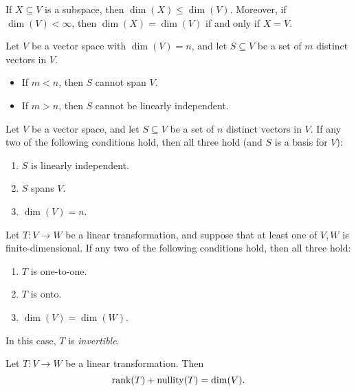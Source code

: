 \begin{fact}
	If $X \subseteq V$ is a subspace, then $\dim(X) \leq \dim(V)$.  Moreover, if
	$\dim(V) < \infty$, then $\dim(X) = \dim(V)$ if and only if $X = V$.
\end{fact}

\begin{fact}
	Let $V$ be a vector space with $\dim(V) = n$, and let $S \subseteq V$ be a set
	of $m$ distinct vectors in $V$.
	\begin{itemize}
		\item If $m < n$, then $S$ cannot span $V$.
		\item If $m > n$, then $S$ cannot be linearly independent.
	\end{itemize}
\end{fact}

\begin{theorem}
	Let $V$ be a vector space, and let $S \subseteq V$ be a set of $n$ distinct
	vectors in $V$. If any two of the following conditions hold, then all three
	hold (and $S$ is a basis for $V$):
	\begin{enumerate}
		\item $S$ is linearly independent.
		\item $S$ spans $V$.
		\item $\dim(V) = n$.
	\end{enumerate}
\end{theorem}

\begin{theorem}
	Let $T : V \rightarrow W$ be a linear transformation, and suppose that at
	least one of $V, W$ is finite-dimensional. If any two of the following
	conditions hold, then all three hold:
	\begin{enumerate}
		\item $T$ is one-to-one.
		\item $T$ is onto.
		\item $\dim(V) = \dim(W)$.
	\end{enumerate}
	In this case, $T$ is \emph{invertible}.
\end{theorem}

\begin{theorem}
	Let $T : V \rightarrow W$ be a linear transformation. Then
	\[
		\text{rank}(T) + \text{nullity}(T) = \dim(V).
	\]
\end{theorem}

